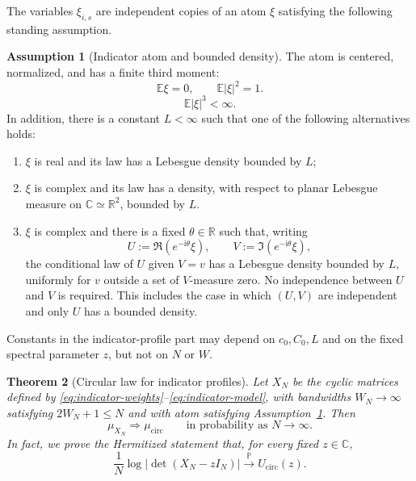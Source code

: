 \documentclass[11pt,reqno]{amsart}
\numberwithin{equation}{section}
\newtheorem{theorem}{Theorem}[section]
\theoremstyle{definition}
\newtheorem{assumption}[theorem]{Assumption}
\theoremstyle{remark}
\newcommand{\C}{\mathbb C}
\newcommand{\R}{\mathbb R}
\newcommand{\E}{\mathbb E}
\newcommand{\Pp}{\mathbb P}
\newcommand{\1}{\mathbf 1}
\newcommand{\cir}{\mathrm{circ}}
\begin{document}
The variables $\xi_{i,s}$ are independent
copies of an atom $\xi$ satisfying the following standing assumption.


\begin{assumption}[Indicator atom and bounded density]
\label{ass:indicator-density}
The atom is centered, normalized, and has a finite third moment:
\begin{equation}\label{eq:atom-normalization}
 \E\xi=0,\qquad \E|\xi|^2=1.
\end{equation}
\begin{equation}\label{eq:atom-moment}
 \E|\xi|^3<\infty.
\end{equation}
In addition, there is a constant $L<\infty$ such that one of the following alternatives holds:
\begin{enumerate}[label=\textnormal{(\roman*)},leftmargin=2.2em]
 \item $\xi$ is real and its law has a Lebesgue density bounded by $L$;
 \item $\xi$ is complex and its law has a density, with respect to planar
       Lebesgue measure on $\C\simeq\R^2$, bounded by $L$.
 \item $\xi$ is complex and there is a fixed $\theta\in\R$ such that,
       writing
       \[
        U:=\Re(e^{-\mathrm i\theta}\xi),\qquad
        V:=\Im(e^{-\mathrm i\theta}\xi),
       \]
       the conditional law of $U$ given $V=v$ has a Lebesgue density
       bounded by $L$, uniformly for $v$ outside a set of $V$-measure zero.
       No independence between $U$ and $V$ is required.  This includes the
       case in which $(U,V)$ are independent and only $U$ has a bounded
       density.
\end{enumerate}
\end{assumption}

Constants in the indicator-profile part may depend on $c_0,C_0,L$ and on
the fixed spectral parameter $z$, but not on $N$ or $W$.

\begin{theorem}[Circular law for indicator profiles]\label{thm:indicator}
Let $X_N$ be the cyclic matrices defined by
\eqref{eq:indicator-weights}--\eqref{eq:indicator-model}, with bandwidths
$W_N\to\infty$ satisfying $2W_N+1\le N$ and with atom satisfying
Assumption~\ref{ass:indicator-density}.  Then
\[
 \mu_{X_N}\Longrightarrow\mu_{\cir}
 \qquad\text{in probability as }N\to\infty.
\]
 In fact, we prove the Hermitized statement that, for every fixed
$z\in\C$,
\begin{equation}\label{eq:indicator-logdet-goal}
 \frac1N\log|\det(X_N-zI_N)|\xrightarrow{\Pp}U_{\cir}(z).
\end{equation}
\end{theorem}
\end{document}
